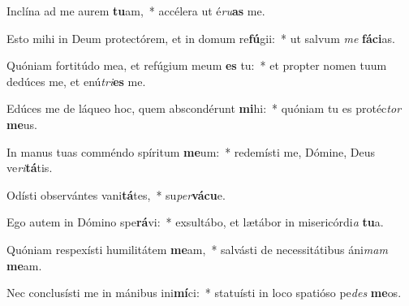 \item Inclína ad me aurem \textbf{tu}am,~* accélera ut é\textit{ru}\textbf{as} me.
\item Esto mihi in Deum protectórem, et in domum re\textbf{fú}gii:~* ut salvum \textit{me} \textbf{fá}\textbf{ci}as.
\item Quóniam fortitúdo mea, et refúgium meum \textbf{es} tu:~* et propter nomen tuum dedúces me, et enú\textit{tri}\textbf{es} me.
\item Edúces me de láqueo hoc, quem abscondérunt \textbf{mi}hi:~* quóniam tu es protéc\textit{tor} \textbf{me}us.
\item In manus tuas comméndo spíritum \textbf{me}um:~* redemísti me, Dómine, Deus ve\textit{ri}\textbf{tá}tis.
\item Odísti observántes vani\textbf{tá}tes,~* su\textit{per}\textbf{vá}\textbf{cu}e.
\item Ego autem in Dómino spe\textbf{rá}vi:~* exsultábo, et lætábor in misericórdi\textit{a} \textbf{tu}a.
\item Quóniam respexísti humilitátem \textbf{me}am,~* salvásti de necessitátibus áni\textit{mam} \textbf{me}am.
\item Nec conclusísti me in mánibus ini\textbf{mí}ci:~* statuísti in loco spatióso pe\textit{des} \textbf{me}os.
